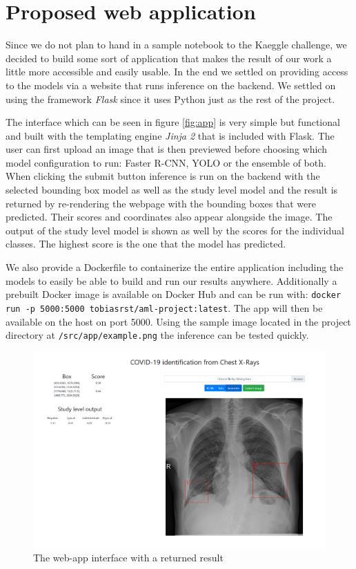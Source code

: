 \chapter{Proposed web application}\label{chapter:webapp}

Since we do not plan to hand in a sample notebook to the Kaeggle challenge, we decided to build some sort of application that makes the result of our work a little more accessible and easily usable. In the end we settled on providing access to the models via a website that runs inference on the backend. We settled on using the framework \textit{Flask} \autocite{ronacher_flask_nodate} since it uses Python just as the rest of the project.

The interface which can be seen in figure \vref{fig:app} is very simple but functional and built with the templating engine \textit{Jinja 2} that is included with Flask. The user can first upload an image that is then previewed before choosing which model configuration to run: Faster \ac{R-CNN}, \ac{YOLO} or the ensemble of both. When clicking the submit button inference is run on the backend with the selected bounding box model as well as the study level model and the result is returned by re-rendering the webpage with the bounding boxes that were predicted. Their scores and coordinates also appear alongside the image. The output of the study level model is shown as well by the scores for the individual classes. The highest score is the one that the model has predicted.

We also provide a Dockerfile to containerize the entire application including the models to easily be able to build and run our results anywhere. Additionally a prebuilt Docker image is available on Docker Hub and can be run with: \texttt{docker run -p 5000:5000 tobiasrst/aml-project:latest}. The app will then be available on the host on port 5000. Using the sample image located in the project directory at \texttt{/src/app/example.png} the inference can be tested quickly.

\begin{figure}[]
	\centering
	\includegraphics[width=0.9\linewidth]{img/app.png}
	\caption{The web-app interface with a returned result}
	\label{fig:app}
\end{figure}